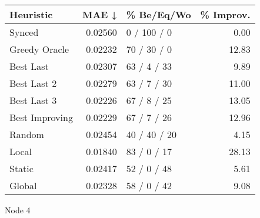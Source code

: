 \begin{tabular}{lrlr}
\toprule
\textbf{Heuristic} & \textbf{MAE ↓} & \textbf{\% Be/Eq/Wo} & \textbf{\% Improv.} \\
\midrule
            Synced &        0.02560 &          0 / 100 / 0 &                0.00 \\
     Greedy Oracle &        0.02232 &          70 / 30 / 0 &               12.83 \\
         Best Last &        0.02307 &          63 / 4 / 33 &                9.89 \\
       Best Last 2 &        0.02279 &          63 / 7 / 30 &               11.00 \\
       Best Last 3 &        0.02226 &          67 / 8 / 25 &               13.05 \\
    Best Improving &        0.02229 &          67 / 7 / 26 &               12.96 \\
            Random &        0.02454 &         40 / 40 / 20 &                4.15 \\
             Local &        0.01840 &          83 / 0 / 17 &               28.13 \\
            Static &        0.02417 &          52 / 0 / 48 &                5.61 \\
            Global &        0.02328 &          58 / 0 / 42 &                9.08 \\
\bottomrule
\end{tabular}
\caption{Node 4}
\label{tab:non_lr01_le2_bs2_4}
